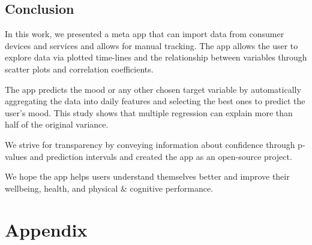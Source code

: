 \documentclass[conference]{IEEEtran}
\begin{document}
\subsection{Conclusion}
In this work, we presented a meta app that can import data from consumer devices and services and allows for manual tracking. The app allows the user to explore data via plotted time-lines and the relationship between variables through scatter plots and correlation coefficients.

The app predicts the mood or any other chosen target variable by automatically aggregating the data into daily features and selecting the best ones to predict the user's mood.
This study shows that multiple regression can explain more than half of the original variance.

We strive for transparency by conveying information about confidence through p-values and prediction intervals and created the app as an open-source project.

We hope the app helps users understand themselves better and improve their wellbeing, health, and physical \& cognitive performance.










\section{Appendix}
\label{sec:Appendix}
\end{document}

